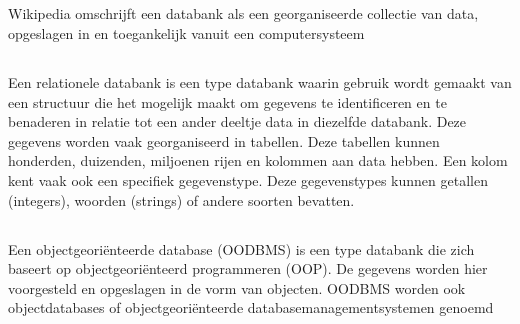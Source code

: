 \subsection{}
\label{subsec:Databank}

Wikipedia omschrijft een databank als een georganiseerde collectie van data, opgeslagen in en toegankelijk vanuit een computersysteem %


\subsection{}
\label{subsec:Relationele Databank}

Een relationele databank is een type databank waarin gebruik wordt gemaakt van een structuur die het mogelijk maakt om gegevens te identificeren en te benaderen in relatie tot een ander deeltje data in diezelfde databank. Deze gegevens worden vaak georganiseerd in tabellen. Deze tabellen kunnen honderden, duizenden, miljoenen rijen en kolommen aan data hebben. Een kolom kent vaak ook een specifiek gegevenstype. Deze gegevenstypes kunnen getallen (integers), woorden (strings) of andere soorten bevatten. %


\subsection{}
\label{subsec:Object-georiënteerde databank}

Een objectgeoriënteerde database (OODBMS) is een type databank die zich baseert op objectgeoriënteerd programmeren (OOP). De gegevens worden hier voorgesteld en opgeslagen in de vorm van objecten. OODBMS worden ook objectdatabases of objectgeoriënteerde databasemanagementsystemen genoemd %


\subsection{}
\label{subsec:SQL}

